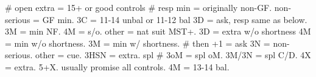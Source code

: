 # open extra = 15+ or good controls
# resp min = originally non-GF. non-serious = GF min. 
3C = 11-14 unbal or 11-12 bal
    3D = ask, resp same as below. 3M = min NF. 4M = s/o. other = nat suit MST+.
3D = extra w/o shortness
    4M = min w/o shortness. 3M = min w/ shortness.  # then +1 = ask
    3N = non-serious. other = cue.
3HSN = extra. spl  # 3oM = spl oM. 3M/3N = spl C/D.
4X = extra. 5+X. usually promise all controls.
4M = 13-14 bal.